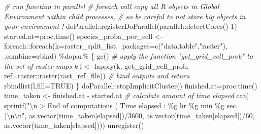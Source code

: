 \documentclass[
]{article}
\newenvironment{Shaded}{\begin{snugshade}}{\end{snugshade}}
\newcommand{\AttributeTok}[1]{\textcolor[rgb]{0.77,0.63,0.00}{#1}}
\newcommand{\CommentTok}[1]{\textcolor[rgb]{0.56,0.35,0.01}{\textit{#1}}}
\newcommand{\ConstantTok}[1]{\textcolor[rgb]{0.00,0.00,0.00}{#1}}
\newcommand{\DecValTok}[1]{\textcolor[rgb]{0.00,0.00,0.81}{#1}}
\newcommand{\FunctionTok}[1]{\textcolor[rgb]{0.00,0.00,0.00}{#1}}
\newcommand{\NormalTok}[1]{#1}
\newcommand{\OtherTok}[1]{\textcolor[rgb]{0.56,0.35,0.01}{#1}}
\newcommand{\SpecialCharTok}[1]{\textcolor[rgb]{0.00,0.00,0.00}{#1}}
\newcommand{\StringTok}[1]{\textcolor[rgb]{0.31,0.60,0.02}{#1}}
\begin{document}
\begin{Shaded}
\begin{Highlighting}[]
\CommentTok{\# run function in parallel}
\CommentTok{\# foreach will copy all R objects in Global Environment within child processes,}
\CommentTok{\# so be careful to not store big objects in your environment !}
\NormalTok{doParallel}\SpecialCharTok{::}\FunctionTok{registerDoParallel}\NormalTok{(parallel}\SpecialCharTok{::}\FunctionTok{detectCores}\NormalTok{()}\SpecialCharTok{{-}}\DecValTok{1}\NormalTok{)}
\NormalTok{started.at}\OtherTok{=}\FunctionTok{proc.time}\NormalTok{()}
\NormalTok{species\_proba\_per\_cell }\OtherTok{\textless{}{-}}\NormalTok{ foreach}\SpecialCharTok{::}\FunctionTok{foreach}\NormalTok{(}\AttributeTok{k=}\NormalTok{raster\_split\_list,}
                                              \AttributeTok{.packages=}\FunctionTok{c}\NormalTok{(}\StringTok{"data.table"}\NormalTok{,}\StringTok{"raster"}\NormalTok{),}
                                              \AttributeTok{.combine=}\StringTok{\textquotesingle{}rbind\textquotesingle{}}\NormalTok{) }\SpecialCharTok{\%dopar\%}\NormalTok{ \{}
  \FunctionTok{gc}\NormalTok{()}
  \CommentTok{\# apply the function "get\_grid\_cell\_prob" to the set of raster maps k}
\NormalTok{  l }\OtherTok{\textless{}{-}} \FunctionTok{lapply}\NormalTok{(k, get\_grid\_cell\_prob, }\AttributeTok{ref=}\NormalTok{raster}\SpecialCharTok{::}\FunctionTok{raster}\NormalTok{(rast\_ref\_file))}
  \CommentTok{\# bind outputs and return}
  \FunctionTok{rbindlist}\NormalTok{(l,}\AttributeTok{fill=}\ConstantTok{TRUE}\NormalTok{)}
\NormalTok{\}}
\NormalTok{doParallel}\SpecialCharTok{::}\FunctionTok{stopImplicitCluster}\NormalTok{()}
\NormalTok{finished.at}\OtherTok{=}\FunctionTok{proc.time}\NormalTok{()}
\NormalTok{time\_taken }\OtherTok{\textless{}{-}}\NormalTok{ finished.at }\SpecialCharTok{{-}}\NormalTok{ started.at }\CommentTok{\# calculate amount of time elapsed}
\FunctionTok{cat}\NormalTok{(}
  \FunctionTok{sprintf}\NormalTok{(}\StringTok{"}\SpecialCharTok{\textbackslash{}n}\StringTok{ \textgreater{} End of computations ( Time elapsed : \%g hr \%g min \%g sec. )}\SpecialCharTok{\textbackslash{}n\textbackslash{}n}\StringTok{"}\NormalTok{,}
          \FunctionTok{as.vector}\NormalTok{(time\_taken[}\StringTok{\textquotesingle{}elapsed\textquotesingle{}}\NormalTok{])}\SpecialCharTok{/}\DecValTok{3600}\NormalTok{, }\FunctionTok{as.vector}\NormalTok{(time\_taken[}\StringTok{\textquotesingle{}elapsed\textquotesingle{}}\NormalTok{])}\SpecialCharTok{/}\DecValTok{60}\NormalTok{,}
          \FunctionTok{as.vector}\NormalTok{(time\_taken[}\StringTok{\textquotesingle{}elapsed\textquotesingle{}}\NormalTok{])))}
\FunctionTok{unregister}\NormalTok{()}


\end{Highlighting}
\end{Shaded}
\end{document}
